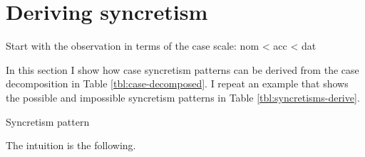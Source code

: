 \section{Deriving syncretism}\label{sec:syncretism}

Start with the observation in terms of the case scale: \ac{nom} < \ac{acc} < \ac{dat}

In this section I show how case syncretism patterns can be derived from the case decomposition in Table \ref{tbl:case-decomposed}. I repeat an example that shows the possible and impossible syncretism patterns in Table \ref{tbl:syncretisms-derive}.

\begin{table}[ht]
  \center
  \caption {Syncretism pattern}
    
  \label{tbl:syncretisms-derive}
\end{table}

The intuition is the following.



